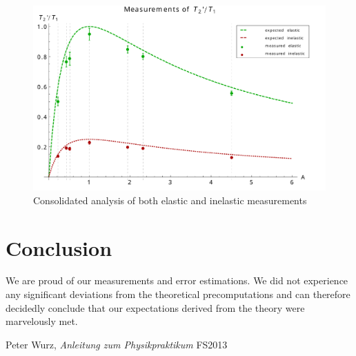 \documentclass{scrreprt}
\renewcommand{\emph}[1]{\textit{#1}}
\begin{document}
\begin{figure}[H]
	\centering
  \includegraphics[width=1.0\textwidth]{diag/error.pdf}
	\caption{Consolidated analysis of both elastic and inelastic measurements}
	\label{fig:analysis}
\end{figure}

\section{Conclusion}
We are proud of our measurements and error estimations. We did not experience any significant deviations from the theoretical precomputations and can therefore decidedly conclude that our expectations derived from the theory were marvelously met. 

\begin{thebibliography}{9}
  Peter Wurz,
  \emph{Anleitung zum Physikpraktikum}
  FS2013

\end{thebibliography}
\end{document}
